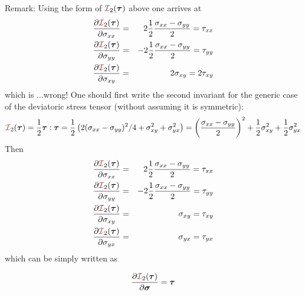 Remark: Using the form of ${\III}_2(\bm\tau)$ above one arrives at  
\begin{eqnarray}
\frac{\partial {\III}_2(\bm\tau)}{\partial \sigma_{xx}} 
&=&  2 \frac{1}{2}  \frac{\sigma_{xx}-\sigma_{yy}}{2} = \tau_{xx}\nn \\
\frac{\partial {\III}_2(\bm\tau)}{\partial \sigma_{yy}} 
&=& -2 \frac{1}{2}  \frac{\sigma_{xx}-\sigma_{yy}}{2} = \tau_{yy} \nn\\
\frac{\partial {\III}_2(\bm\tau)}{\partial \sigma_{xy}} 
&=& 2 \sigma_{xy} =  2 \tau_{xy}\nn
\end{eqnarray}
which is ...wrong! One should first write the second invariant 
for the generic case of the deviatoric stress tensor (without 
assuming it is symmetric):
\[
{\III}_2(\bm\tau) = \frac12 \bm\tau:\bm\tau
= \frac12 \left( 2 (\sigma_{xx}-\sigma_{yy})^2/4 + \sigma_{xy}^2 + \sigma_{yx}^2 \right)
= \left(\frac{\sigma_{xx}-\sigma_{yy}}{2} \right)^2 + \frac12\sigma_{xy}^2 + \frac12\sigma_{yx}^2
\]
Then
\begin{eqnarray}
\frac{\partial {\III}_2(\bm\tau)}{\partial \sigma_{xx}} 
&=&  2 \frac{1}{2}  \frac{\sigma_{xx}-\sigma_{yy}}{2} = \tau_{xx} \nn\\
\frac{\partial {\III}_2(\bm\tau)}{\partial \sigma_{yy}} 
&=& -2 \frac{1}{2}  \frac{\sigma_{xx}-\sigma_{yy}}{2} =  \tau_{yy} \nn\\
\frac{\partial {\III}_2(\bm\tau)}{\partial \sigma_{xy}} 
&=&  \sigma_{xy} =  \tau_{xy} \nn\\
\frac{\partial {\III}_2(\bm\tau)}{\partial \sigma_{yx}} 
&=&  \sigma_{yx} =  \tau_{yx} \nn
\end{eqnarray}
which can be simply written as
\begin{mdframed}[backgroundcolor=blue!5]
\[
\frac{\partial {\III}_2(\bm\tau)}{\partial \bm\sigma} 
=\bm\tau
\]
\end{mdframed}




















